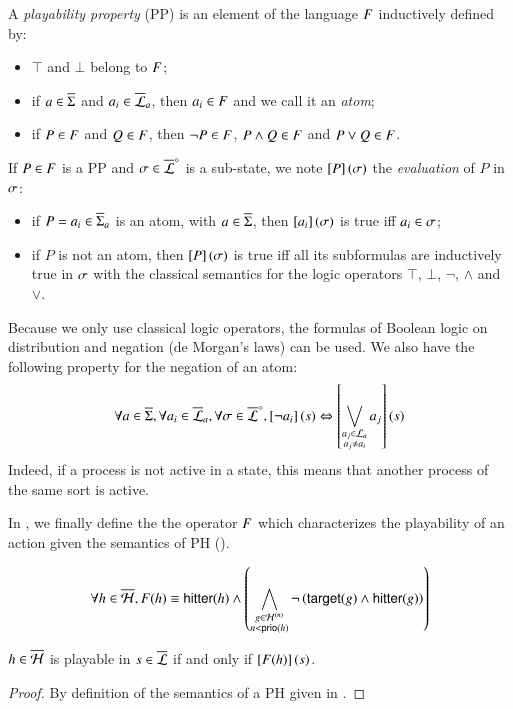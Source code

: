 \begin{definition}
  \label{def:pp}
  A \emph{playability property} (PP) is an element of the language $F$ inductively defined by:
  \begin{itemize}
    \item $\top$ and $\bot$ belong to $F$;
    \item if $a \in \overline{\Sigma}$ and $a_i \in \overline{\mathcal{L}}_a$, then $a_i \in F$ and we call it an \emph{atom};
    \item if $P \in F$ and $Q \in F$, then $\neg P \in F$, $P \wedge Q \in F$ and $P \vee Q \in F$.
  \end{itemize}
  If $P \in F$ is a PP and $\sigma \in \overline{\mathcal{L}}^\diamond$ is a sub-state,
  we note $\left[P\right](\sigma)$ the \emph{evaluation} of $P$ in $\sigma$:
  \begin{itemize}
    \item if $P = a_i \in \overline{\Sigma}_a$ is an atom, with $a \in \overline{\Sigma}$, then $\left[a_i\right](\sigma)$ is true iff $a_i \in \sigma$;
    \item if $P$ is not an atom, then $\left[P\right](\sigma)$ is true iff all its subformulas are inductively true in $\sigma$
      with the classical semantics for the logic operators $\top$, $\bot$, $\neg$, $\wedge$ and $\vee$.
  \end{itemize}
\end{definition}

Because we only use classical logic operators, the formulas of Boolean logic on distribution and negation (de Morgan's laws) can be used.
We also have the following property for the negation of an atom:
\[\forall a \in \overline{\Sigma}, \forall a_i \in \overline{\mathcal{L}}_a, \forall \sigma \in \overline{\mathcal{L}}^\diamond,
  \left[\neg a_i\right](s) \Leftrightarrow \left[\bigvee_{\substack{a_j \in \mathcal{L}_a\\a_j \neq a_i}} a_j\right](s)\]
Indeed, if a process is not active in a state, this means that another process of the same sort is active.

In , we finally define the the operator $F$ which characterizes the playability of an action
given the semantics of PH ().
\begin{definition}\label{def:fop}
  $$\forall h \in \overline{\mathcal{H}}, F(h) \equiv \mathsf{hitter}(h) \wedge
    \left( \bigwedge_{\substack{g \in \mathcal{H}^{(n)}\\n < \mathsf{prio}(h)}}
    \neg \left( \mathsf{target}(g) \wedge \mathsf{hitter}(g)\right) \right)$$
\end{definition}
%
\begin{theorem}
\label{th:ppplay}
  $h \in \overline{\mathcal{H}}$ is playable in $s \in \overline{\mathcal{L}}$ if and only if $\left[F(h)\right](s)$.
\end{theorem}
%
\begin{proof}
  By definition of the semantics of a PH given in .
\end{proof}

